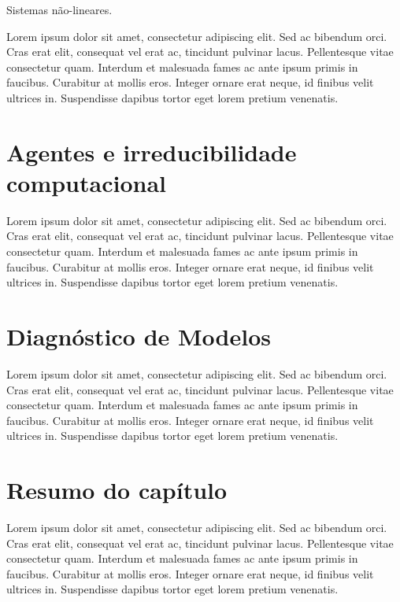 \documentclass[./main.tex]{subfiles}
\begin{document}
\par Sistemas não-lineares.
\par Lorem ipsum dolor sit amet, consectetur adipiscing elit. Sed ac bibendum orci. Cras erat elit, consequat vel erat ac, tincidunt pulvinar lacus. Pellentesque vitae consectetur quam. Interdum et malesuada fames ac ante ipsum primis in faucibus. Curabitur at mollis eros. Integer ornare erat neque, id finibus velit ultrices in. Suspendisse dapibus tortor eget lorem pretium venenatis.

\section{Agentes e irreducibilidade computacional}
\par Lorem ipsum dolor sit amet, consectetur adipiscing elit. Sed ac bibendum orci. Cras erat elit, consequat vel erat ac, tincidunt pulvinar lacus. Pellentesque vitae consectetur quam. Interdum et malesuada fames ac ante ipsum primis in faucibus. Curabitur at mollis eros. Integer ornare erat neque, id finibus velit ultrices in. Suspendisse dapibus tortor eget lorem pretium venenatis.

\section{Diagnóstico de Modelos}
\par Lorem ipsum dolor sit amet, consectetur adipiscing elit. Sed ac bibendum orci. Cras erat elit, consequat vel erat ac, tincidunt pulvinar lacus. Pellentesque vitae consectetur quam. Interdum et malesuada fames ac ante ipsum primis in faucibus. Curabitur at mollis eros. Integer ornare erat neque, id finibus velit ultrices in. Suspendisse dapibus tortor eget lorem pretium venenatis.

\clearpage

\section{Resumo do capítulo}

\par Lorem ipsum dolor sit amet, consectetur adipiscing elit. Sed ac bibendum orci. Cras erat elit, consequat vel erat ac, tincidunt pulvinar lacus. Pellentesque vitae consectetur quam. Interdum et malesuada fames ac ante ipsum primis in faucibus. Curabitur at mollis eros. Integer ornare erat neque, id finibus velit ultrices in. Suspendisse dapibus tortor eget lorem pretium venenatis.
\end{document}
